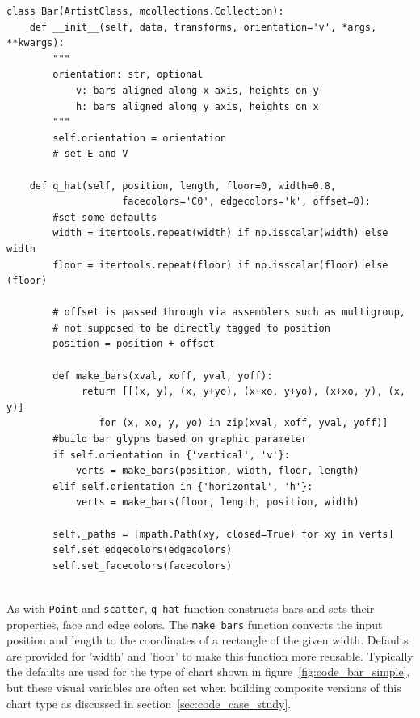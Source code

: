 \documentclass[../main.tex]{subfiles}
\begin{document}
\begin{verbatim}
class Bar(ArtistClass, mcollections.Collection):
    def __init__(self, data, transforms, orientation='v', *args, **kwargs):
        """
        orientation: str, optional
            v: bars aligned along x axis, heights on y
            h: bars aligned along y axis, heights on x
        """
        self.orientation = orientation
        # set E and V

    def q_hat(self, position, length, floor=0, width=0.8, 
                    facecolors='C0', edgecolors='k', offset=0):
        #set some defaults
        width = itertools.repeat(width) if np.isscalar(width) else width
        floor = itertools.repeat(floor) if np.isscalar(floor) else (floor)
        
        # offset is passed through via assemblers such as multigroup, 
        # not supposed to be directly tagged to position 
        position = position + offset
        
        def make_bars(xval, xoff, yval, yoff):
             return [[(x, y), (x, y+yo), (x+xo, y+yo), (x+xo, y), (x, y)] 
                for (x, xo, y, yo) in zip(xval, xoff, yval, yoff)]
        #build bar glyphs based on graphic parameter
        if self.orientation in {'vertical', 'v'}:
            verts = make_bars(position, width, floor, length)
        elif self.orientation in {'horizontal', 'h'}:
            verts = make_bars(floor, length, position, width)
        
        self._paths = [mpath.Path(xy, closed=True) for xy in verts]
        self.set_edgecolors(edgecolors)
        self.set_facecolors(facecolors)
    
\end{verbatim}
 As with \texttt{Point} and \texttt{scatter}, \texttt{q_hat} function constructs bars and sets their properties, face and edge colors. The \texttt{make_bars} function converts the input position and length to the coordinates of a rectangle of the given width. Defaults are provided for 'width' and 'floor' to make this function more reusable. Typically the defaults are used for the type of chart shown in figure~\ref{fig:code_bar_simple}, but these visual variables are often set when building composite versions of this chart type as discussed in section~\ref{sec:code_case_study}. 
\end{document}
